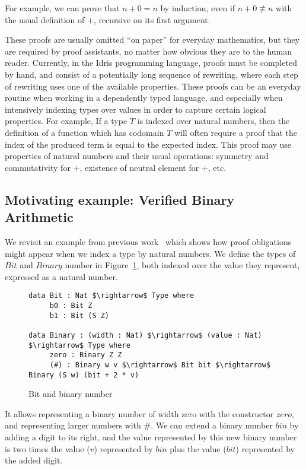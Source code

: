 For example, we can prove that $n+0 = n$ by induction, even if $n+0 \not\equiv
n$ with the usual definition of $+$, recursive on its first argument. 

These proofs are usually omitted ``on paper'' for everyday mathematics, but
they are required by proof assistants, no matter how obvious they are to the
human reader.
Currently, in the Idris programming language, proofs must be completed
by hand, and consist
of a potentially long sequence of rewriting, where each step of
rewriting uses one of the available properties. These proofs can be
an everyday
routine when working in a dependently typed language, and especially
when intensively indexing types over values in order to capture certain logical
properties.  For example, If a type $T$ is indexed over natural numbers, then
the definition of a function which has codomain $T$ will often require a
proof that the index of the produced term is equal to the expected index. This
proof may use properties of natural numbers and their usual operations:
symmetry and commutativity for +, existence of neutral element for +, etc.

\subsection{Motivating example: Verified Binary Arithmetic}

We revisit an example from previous work~\cite{bradytfp07} 
which shows how proof obligations might appear
when we index a type by natural numbers.  We define the types of
$Bit$ and $Binary$ number in Figure~\ref{binarynums}, 
both indexed over the value they represent, expressed as a natural number.

\begin{figure}[H]
\figrule
\begin{center}
\begin{lstlisting}
data Bit : Nat $\rightarrow$ Type where
     b0 : Bit Z
     b1 : Bit (S Z)
     
data Binary : (width : Nat) $\rightarrow$ (value : Nat) $\rightarrow$ Type where
     zero : Binary Z Z
     (#) : Binary w v $\rightarrow$ Bit bit $\rightarrow$ Binary (S w) (bit + 2 * v)
\end{lstlisting}
\end{center}
\caption{Bit and binary number}
\label{binarynums}
\figrule
\end{figure}

It allows representing a
binary number of width zero with the constructor $zero$, 
and representing larger numbers with $\#$.
We
can extend a binary number $bin$ by adding a digit to its right, and the value
represented by this new binary number is two times the value ($v$) represented
by $bin$ plus the value ($bit$) represented by the added digit.

